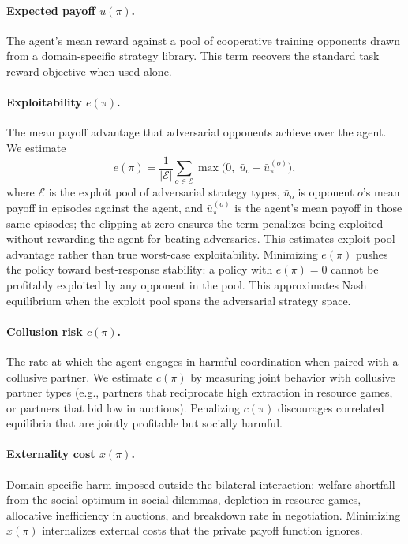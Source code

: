 \documentclass[letterpaper]{article} %
\begin{document}
\paragraph{Expected payoff $u(\pi)$.} The agent's mean reward against a pool of cooperative training opponents drawn from a domain-specific strategy library. This term recovers the standard task reward objective when used alone.
\paragraph{Exploitability $e(\pi)$.} The mean payoff advantage that adversarial opponents achieve over the agent. We estimate
\begin{equation*}
e(\pi) = \frac{1}{|\mathcal{E}|}\sum_{o \in \mathcal{E}} \max\!\bigl(0,\; \bar{u}_o - \bar{u}_\pi^{(o)}\bigr),
\end{equation*}
where $\mathcal{E}$ is the exploit pool of adversarial strategy types, $\bar{u}_o$ is opponent $o$'s mean payoff in episodes against the agent, and $\bar{u}_\pi^{(o)}$ is the agent's mean payoff in those same episodes; the clipping at zero ensures the term penalizes being exploited without rewarding the agent for beating adversaries. This estimates exploit-pool advantage rather than true worst-case exploitability. Minimizing $e(\pi)$ pushes the policy toward best-response stability: a policy with $e(\pi) = 0$ cannot be profitably exploited by any opponent in the pool. This approximates Nash equilibrium when the exploit pool spans the adversarial strategy space.
\paragraph{Collusion risk $c(\pi)$.} The rate at which the agent engages in harmful coordination when paired with a collusive partner. We estimate $c(\pi)$ by measuring joint behavior with collusive partner types (e.g., partners that reciprocate high extraction in resource games, or partners that bid low in auctions). Penalizing $c(\pi)$ discourages correlated equilibria that are jointly profitable but socially harmful.
\paragraph{Externality cost $x(\pi)$.} Domain-specific harm imposed outside the bilateral interaction: welfare shortfall from the social optimum in social dilemmas, depletion in resource games, allocative inefficiency in auctions, and breakdown rate in negotiation. Minimizing $x(\pi)$ internalizes external costs that the private payoff function ignores.
\end{document}
